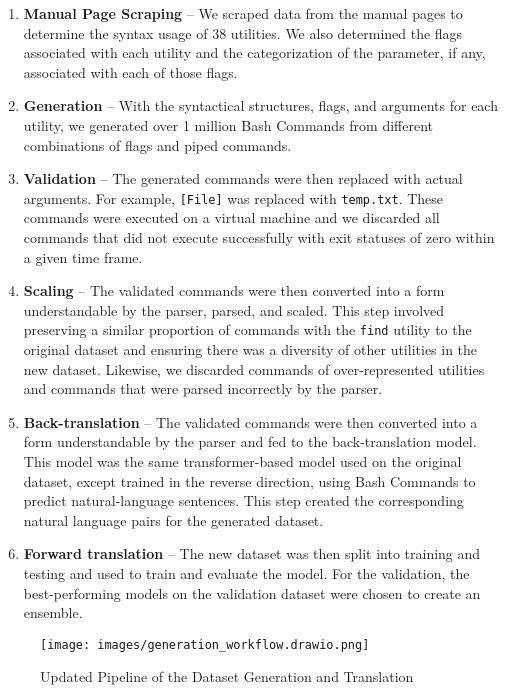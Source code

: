 \documentclass{river-journal}
\begin{document}
\begin{enumerate}
  \item{\bf Manual Page Scraping} --
  We scraped data from the manual pages to determine the syntax usage of 38 utilities. We also determined the flags associated with each utility and the categorization of the parameter, if any, associated with each of those flags.
  \item{\bf Generation} --
  With the syntactical structures, flags, and arguments for each utility, we generated over 1 million Bash Commands from different combinations of flags and piped commands. 
  \item{\bf Validation} --
  The generated commands were then replaced with actual arguments. For example, \texttt{[File]} was replaced with \texttt{temp.txt}. These commands were executed on a virtual machine and we discarded all commands that did not execute successfully with exit statuses of zero within a given time frame. 
  \item{\bf Scaling} -- 
  The validated commands were then converted into a form understandable by the parser, parsed, and scaled. This step involved preserving a similar proportion of commands with the \texttt{find} utility to the original dataset and ensuring there was a diversity of other utilities in the new dataset. Likewise, we discarded commands of over-represented utilities and commands that were parsed incorrectly by the parser.
  \item{\bf Back-translation} --
  The validated commands were then converted into a form understandable by the parser and fed to the back-translation model. This model was the same transformer-based model used on the original dataset, except trained in the reverse direction, using Bash Commands to predict natural-language sentences. This step created the corresponding natural language pairs for the generated dataset.
  \item{\bf Forward translation} --
  The new dataset was then split into training and testing and used to train and evaluate the model. For the validation, the best-performing models on the validation dataset were chosen to create an ensemble.
\end{enumerate}

\begin{figure*}
    \centering
    \texttt{[image: images/generation\_workflow.drawio.png]}
    \caption{Updated Pipeline of the Dataset Generation and Translation}
    \label{fig:pipeline}
\end{figure*}
\end{document}
